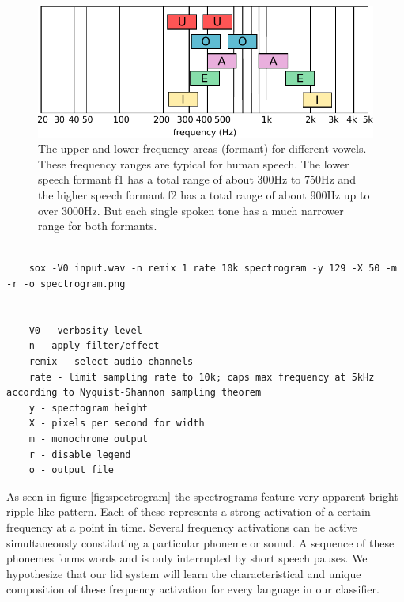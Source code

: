 	\begin{figure}[]
  		\centering
    	\includegraphics[width=\textwidth,keepaspectratio]{img/frequencies.pdf}
    	\caption{The upper and lower frequency areas (formant) for different vowels. These frequency ranges are typical for human speech. The lower speech formant f1 has a total range of about 300Hz to 750Hz and the higher speech formant f2 has a total range of about 900Hz up to over 3000Hz. But each single spoken tone has a much narrower range for both formants.}
    	\label{img:frequencies}
	\end{figure}	
	
	\begin{minipage}{\linewidth}
	\begin{lstlisting}[caption={SoX command and options used for generating monochrome spectrograms. All audio files were discretized into 129 frequency buckets using a constant pixel width per time step resulting into spectrogram images of 500x129 pixels.}, label={lst:spectrograms}]
    
    sox -V0 input.wav -n remix 1 rate 10k spectrogram -y 129 -X 50 -m -r -o spectrogram.png
    
    
    V0 - verbosity level 
    n - apply filter/effect
    remix - select audio channels
    rate - limit sampling rate to 10k; caps max frequency at 5kHz according to Nyquist-Shannon sampling theorem
    y - spectogram height
    X - pixels per second for width
    m - monochrome output
    r - disable legend
    o - output file
    \end{lstlisting}
    \end{minipage}
	
	As seen in figure \ref{fig:spectrogram} the spectrograms feature very apparent bright ripple-like pattern. Each of these represents a strong activation of a certain frequency at a point in time. Several frequency activations can be active simultaneously constituting a particular phoneme or sound. A sequence of these phonemes forms words and is only interrupted by short speech pauses. We hypothesize that our \ac{lid} system will learn the characteristical and unique composition of these frequency activation for every language in our classifier. 

